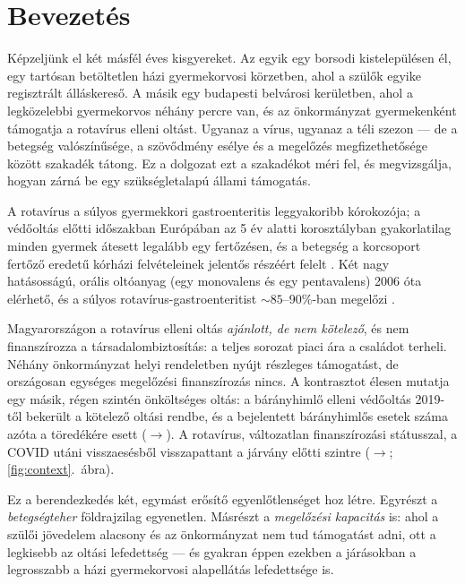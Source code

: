 \documentclass[11pt,a4paper]{article}
\begin{document}
\tableofcontents

\section{Bevezetés}

Képzeljünk el két másfél éves kisgyereket. Az egyik egy borsodi kistelepülésen
él, egy tartósan betöltetlen házi gyermekorvosi körzetben, ahol a szülők
egyike regisztrált álláskereső. A másik egy budapesti belvárosi kerületben,
ahol a legközelebbi gyermekorvos néhány percre van, és az önkormányzat
gyermekenként támogatja a rotavírus elleni oltást. Ugyanaz a vírus, ugyanaz
a téli szezon --- de a betegség valószínűsége, a szövődmény esélye és a
megelőzés megfizethetősége között szakadék tátong. Ez a dolgozat ezt a
szakadékot méri fel, és megvizsgálja, hogyan zárná be egy szükségletalapú
állami támogatás.

A rotavírus a súlyos gyermekkori gastroenteritis leggyakoribb kórokozója; a
védőoltás előtti időszakban Európában az 5 év alatti korosztályban gyakorlatilag
minden gyermek átesett legalább egy fertőzésen, és a betegség a korcsoport
fertőző eredetű kórházi felvételeinek jelentős részéért felelt
\citep{soriano2006,who2021rota}. Két nagy hatásosságú, orális oltóanyag
(egy monovalens és egy pentavalens) 2006 óta elérhető, és a súlyos
rotavírus-gastroenteritist ${\sim}85$--90\%-ban megelőzi
\citep{vesikari2006,ruizpalacios2006,who2021rota}.

Magyarországon a rotavírus elleni oltás \emph{ajánlott, de nem kötelező}, és
nem finanszírozza a társadalombiztosítás: a teljes sorozat piaci ára a
családot terheli. Néhány önkormányzat helyi rendeletben nyújt részleges
támogatást, de országosan egységes megelőzési finanszírozás nincs. A
kontrasztot élesen mutatja egy másik, régen szintén önköltséges oltás: a
bárányhimlő elleni védőoltás 2019-től bekerült a kötelező oltási rendbe, és
a bejelentett bárányhimlős esetek száma azóta a töredékére esett
(\variAnnPre{}$\to$\variAnnXs). A rotavírus, változatlan finanszírozási
státusszal, a COVID utáni visszaesésből visszapattant a járvány előtti
szintre (\rotaAnnPre{}$\to$\rotaAnnXs; \ref{fig:context}.~ábra).

Ez a berendezkedés két, egymást erősítő egyenlőtlenséget hoz létre. Egyrészt
a \emph{betegségteher} földrajzilag egyenetlen. Másrészt a \emph{megelőzési
kapacitás} is: ahol a szülői jövedelem alacsony és az önkormányzat nem tud
támogatást adni, ott a legkisebb az oltási lefedettség --- és gyakran éppen
ezekben a járásokban a legrosszabb a házi gyermekorvosi alapellátás
lefedettsége is.
\end{document}
